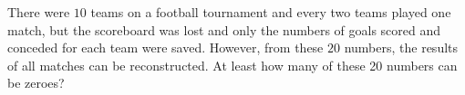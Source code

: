 \problem
There were $10$ teams on a football tournament and every two teams played one
match, but the scoreboard was lost and only the numbers of goals scored and
conceded for each team were saved.
However, from these $20$ numbers, the results of all matches can be
reconstructed.
At least how many of these 20 numbers can be zeroes?
\solution
\endproblem
